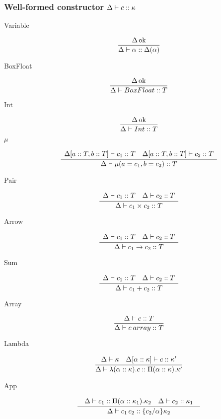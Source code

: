 \documentclass[12pt,twoside,fleqn]{amsart}
\theoremstyle{plain}
\theoremstyle{plain}
\theoremstyle{definition}
\begin{document}
\subsubsection{Well-formed constructor \protect\( \Delta  \vdash c  ::\kappa  \protect \)}

\begin{description}
\item [Variable]
\[
\frac{\Delta  \, \mathrm{ok} }{\Delta  \vdash \alpha   ::\Delta (\alpha )  }\]

\item [BoxFloat]
\[
\frac{\Delta  \, \mathrm{ok} }{\Delta  \vdash BoxFloat  ::T  }\]

\item [Int]
\[
\frac{\Delta  \, \mathrm{ok} }{\Delta  \vdash Int  ::T  }\]

\item [\( \mu  \)]
\[
\frac{\begin{array}{ll}
\Delta [a::T,b::T] \vdash c_{1} ::T & \Delta [a::T,b::T] \vdash c_{2} ::T
\end{array} }{\Delta  \vdash \mu (a=c_{1},b=c_{2})  ::T  }\]
 
\item [Pair]
\[
\frac{\begin{array}{ll}
\Delta  \vdash c_{1}  ::T  & \Delta  \vdash c_{2}  ::T 
\end{array} }{\Delta  \vdash c_{1}\times c_{2}  ::T  }\]

\item [Arrow]
\[
\frac{\begin{array}{ll}
\Delta  \vdash c_{1}  ::T  & \Delta  \vdash c_{2}  ::T 
\end{array} }{\Delta  \vdash c_{1}\rightarrow c_{2}  ::T  }\]

\item [Sum]
\[
\frac{\begin{array}{ll}
\Delta  \vdash c_{1}  ::T  & \Delta  \vdash c_{2}  ::T 
\end{array} }{\Delta  \vdash c_{1}+c_{2}  ::T  }\]

\item [Array]
\[
\frac{\Delta  \vdash c  ::T  }{\Delta  \vdash c \: array  ::T  }\]

\item [Lambda]
\[
\frac{\begin{array}{ll}
\Delta  \vdash \kappa   & \Delta  [\alpha   ::\kappa   ] \vdash c ::\kappa '
\end{array} }{\Delta  \vdash \lambda (\alpha ::\kappa ).c  ::\Pi (\alpha  ::\kappa  ).\kappa '  }\]

\item [App]
\[
\frac{\begin{array}{cc}
\begin{array}{ll}
\Delta  \vdash c_{1}  ::\Pi (\alpha  ::\kappa _{1} ).\kappa _{2}   & \Delta  \vdash c_{2}  ::\kappa _{1}  
\end{array}
\end{array} }{\Delta  \vdash c_{1}\, c_{2}  ::\{c_{2} /\alpha  \}\kappa _{2}   }\]


\end{description}
\end{document}
